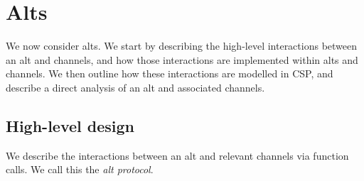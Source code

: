\section{Alts}
\label{sec:alt}

\inlineScala

We now consider alts.  We start by describing the high-level interactions
between an alt and channels, and how those interactions are implemented within
alts and channels.  We then outline how these interactions are modelled in
CSP, and describe a direct analysis of an alt and associated channels.


\subsection{High-level design}

We describe the interactions between an alt and relevant channels via function
calls.  We call this the \emph{alt protocol}. 


